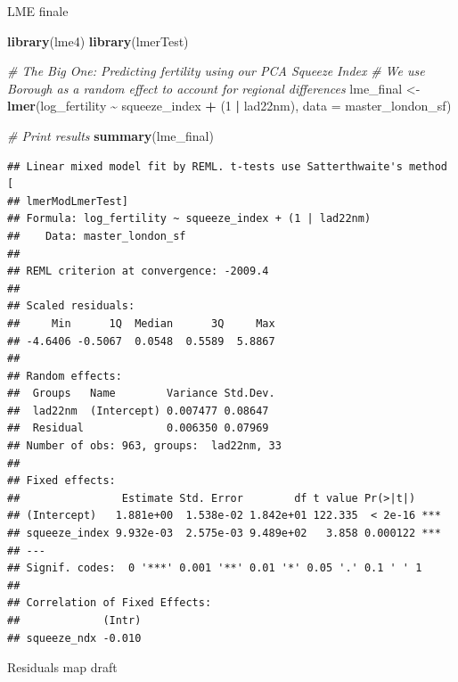 \documentclass[
]{article}
\newenvironment{Shaded}{\begin{snugshade}}{\end{snugshade}}
\newcommand{\AttributeTok}[1]{\textcolor[rgb]{0.13,0.29,0.53}{#1}}
\newcommand{\CommentTok}[1]{\textcolor[rgb]{0.56,0.35,0.01}{\textit{#1}}}
\newcommand{\DecValTok}[1]{\textcolor[rgb]{0.00,0.00,0.81}{#1}}
\newcommand{\FunctionTok}[1]{\textcolor[rgb]{0.13,0.29,0.53}{\textbf{#1}}}
\newcommand{\NormalTok}[1]{#1}
\newcommand{\OtherTok}[1]{\textcolor[rgb]{0.56,0.35,0.01}{#1}}
\newcommand{\SpecialCharTok}[1]{\textcolor[rgb]{0.81,0.36,0.00}{\textbf{#1}}}
\begin{document}
LME finale

\begin{Shaded}
\begin{Highlighting}[]
\FunctionTok{library}\NormalTok{(lme4)}
\FunctionTok{library}\NormalTok{(lmerTest)}

\CommentTok{\# The Big One: Predicting fertility using our PCA \textquotesingle{}Squeeze\textquotesingle{} Index}
\CommentTok{\# We use Borough as a random effect to account for regional differences}
\NormalTok{lme\_final }\OtherTok{\textless{}{-}} \FunctionTok{lmer}\NormalTok{(log\_fertility }\SpecialCharTok{\textasciitilde{}}\NormalTok{ squeeze\_index }\SpecialCharTok{+}\NormalTok{ (}\DecValTok{1} \SpecialCharTok{|}\NormalTok{ lad22nm), }
                  \AttributeTok{data =}\NormalTok{ master\_london\_sf)}

\CommentTok{\# Print results}
\FunctionTok{summary}\NormalTok{(lme\_final)}
\end{Highlighting}
\end{Shaded}

\begin{verbatim}
## Linear mixed model fit by REML. t-tests use Satterthwaite's method [
## lmerModLmerTest]
## Formula: log_fertility ~ squeeze_index + (1 | lad22nm)
##    Data: master_london_sf
## 
## REML criterion at convergence: -2009.4
## 
## Scaled residuals: 
##     Min      1Q  Median      3Q     Max 
## -4.6406 -0.5067  0.0548  0.5589  5.8867 
## 
## Random effects:
##  Groups   Name        Variance Std.Dev.
##  lad22nm  (Intercept) 0.007477 0.08647 
##  Residual             0.006350 0.07969 
## Number of obs: 963, groups:  lad22nm, 33
## 
## Fixed effects:
##                Estimate Std. Error        df t value Pr(>|t|)    
## (Intercept)   1.881e+00  1.538e-02 1.842e+01 122.335  < 2e-16 ***
## squeeze_index 9.932e-03  2.575e-03 9.489e+02   3.858 0.000122 ***
## ---
## Signif. codes:  0 '***' 0.001 '**' 0.01 '*' 0.05 '.' 0.1 ' ' 1
## 
## Correlation of Fixed Effects:
##             (Intr)
## squeeze_ndx -0.010
\end{verbatim}

Residuals map draft
\end{document}
